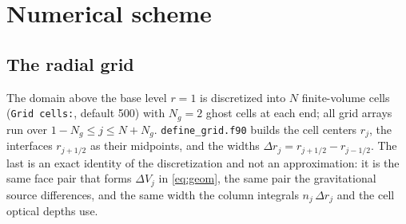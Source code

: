\section{Numerical scheme}
\label{sec:numerics}

\subsection{The radial grid}
\label{sec:numerics:grid}

The domain above the base level $r = 1$ is discretized into $N$ finite-volume cells
(\texttt{Grid cells:}, default 500) with $N_g = 2$ ghost cells at each end;
all grid arrays run over $1-N_g \le j \le N+N_g$.  \texttt{define\_grid.f90}
builds the cell centers $r_j$, the interfaces $r_{j+1/2}$ as their midpoints,
and the widths $\Delta r_j = r_{j+1/2} - r_{j-1/2}$.  The last is an exact
identity of the discretization and not an approximation: it is the same face
pair that forms $\Delta V_j$ in \eqref{eq:geom}, the same pair the
gravitational source differences, and the same width the column integrals
$n_j\,\Delta r_j$ and the cell optical depths use.

